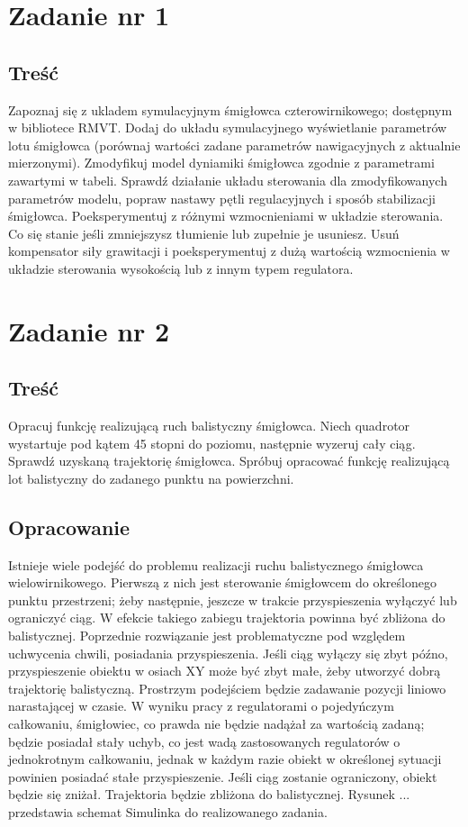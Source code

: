 \documentclass[polish,11pt,a4paper]{article}
\begin{document}
\section*{Zadanie nr 1}
\subsection*{Treść}
Zapoznaj się z ukladem symulacyjnym śmigłowca czterowirnikowego; dostępnym
w bibliotece RMVT. Dodaj do układu symulacyjnego wyświetlanie parametrów lotu śmigłowca 
(porównaj wartości zadane parametrów nawigacyjnych z aktualnie mierzonymi). Zmodyfikuj
model dyniamiki śmigłowca zgodnie z parametrami zawartymi w tabeli. Sprawdź działanie układu
sterowania dla zmodyfikowanych parametrów modelu, popraw nastawy pętli regulacyjnych i sposób
stabilizacji śmigłowca. Poeksperymentuj z różnymi wzmocnieniami w układzie sterowania. Co się 
stanie jeśli zmniejszysz tłumienie lub zupełnie je usuniesz. Usuń kompensator siły grawitacji
i poeksperymentuj z dużą wartością wzmocnienia w układzie sterowania wysokością lub z innym 
typem regulatora.

\section*{Zadanie nr 2}
\subsection*{Treść}
Opracuj funkcję realizującą ruch balistyczny śmigłowca. Niech quadrotor wystartuje
pod kątem 45 stopni do poziomu, następnie wyzeruj cały ciąg. Sprawdź uzyskaną trajektorię śmigłowca.
Spróbuj opracować funkcję realizującą lot balistyczny do zadanego punktu na powierzchni.

\subsection*{Opracowanie}
Istnieje wiele podejść do problemu realizacji ruchu balistycznego śmigłowca wielowirnikowego.
Pierwszą z nich jest sterowanie śmigłowcem do określonego punktu przestrzeni; żeby następnie, jeszcze 
w trakcie przyspieszenia wyłączyć lub ograniczyć ciąg. W efekcie takiego zabiegu trajektoria powinna być
zbliżona do balistycznej. Poprzednie rozwiązanie jest problematyczne pod względem uchwycenia chwili, 
posiadania przyspieszenia. Jeśli ciąg wyłączy się zbyt późno, przyspieszenie obiektu w osiach XY może być
zbyt małe, żeby utworzyć dobrą trajektorię balistyczną. Prostrzym podejściem będzie zadawanie pozycji
liniowo narastającej w czasie. W wyniku pracy z regulatorami o pojedyńczym całkowaniu, śmigłowiec, co prawda
nie będzie nadążał za wartością zadaną; będzie posiadał stały uchyb, co jest wadą zastosowanych regulatorów o 
jednokrotnym całkowaniu, jednak w każdym razie obiekt w określonej sytuacji powinien posiadać stałe przyspieszenie.
Jeśli ciąg zostanie ograniczony, obiekt będzie się zniżał. Trajektoria będzie zbliżona 
do balistycznej. Rysunek ... przedstawia schemat Simulinka do realizowanego zadania.
\end{document}

